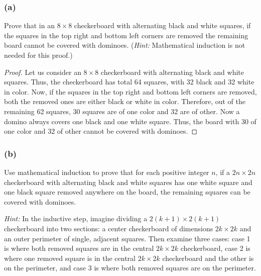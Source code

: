 \documentclass[14pt]{extarticle}
\begin{document}
\subsubsection{(a)}
Prove that in an $8 \times 8$ checkerboard with alternating black and white squares, if the squares in the top right and bottom left corners are removed the remaining board cannot be covered with dominoes. ({\it Hint:} Mathematical induction is not needed for this proof.)

\begin{proof}
    Let us consider an $8 \times 8$ checkerboard with alternating black and white squares. Thus, the checkerboard has total 64 squares, with 32 black and 32 white in color. Now, if the squares in the top right and bottom left corners are removed, both the removed ones are either black or white in color. Therefore, out of the remaining 62 squares, 30 squares are of one color and 32 are of other. Now a domino always covers one black and one white square. Thus, the board with 30 of one color and 32 of other cannot be covered with dominoes.
\end{proof}

\subsubsection{(b)}
Use mathematical induction to prove that for each positive integer $n$, if a $2n \times 2n$ checkerboard with alternating black and white squares has one white square and one black square removed anywhere on the board, the remaining squares can be covered with dominoes.

    {\it Hint:} In the inductive step, imagine dividing a $2(k + 1) \times 2(k + 1)$ checkerboard into two sections: a center checkerboard of dimensions $2k \times 2k$ and an outer perimeter of single, adjacent squares. Then examine three cases: case 1 is where both removed squares are in the central $2k \times 2k$ checkerboard, case 2 is where one removed square is in the central $2k \times 2k$ checkerboard and the other is on the perimeter, and case 3 is where both removed squares are on the perimeter.
\end{document}
